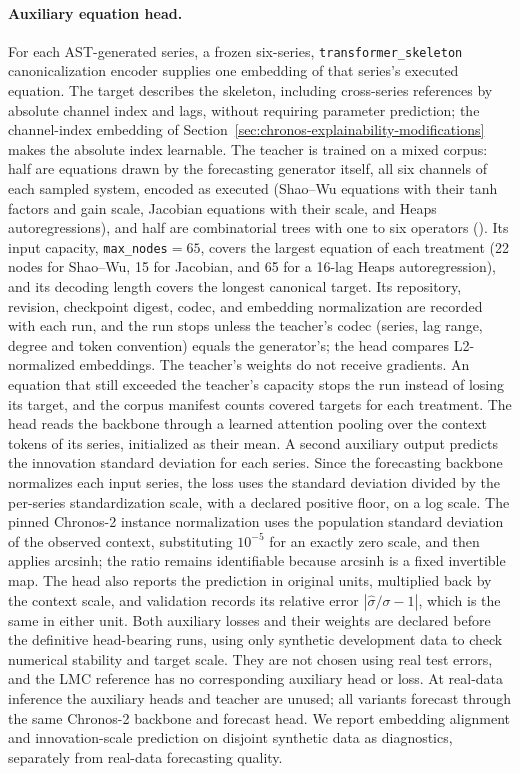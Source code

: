 \paragraph{Auxiliary equation head.}
For each AST-generated series, a frozen six-series,
\texttt{transformer\_skeleton} canonicalization encoder supplies one embedding
of that series's executed equation. The target describes the skeleton,
including cross-series references by absolute channel index and lags, without
requiring parameter prediction; the channel-index embedding of
Section~\ref{sec:chronos-explainability-modifications} makes the absolute index
learnable. The teacher is trained on a mixed corpus: half are equations drawn
by the forecasting generator itself, all six channels of each sampled system,
encoded as executed (Shao--Wu equations with their tanh factors and gain scale,
Jacobian equations with their scale, and Heaps autoregressions), and half are
combinatorial trees with one to six operators
(). Its input
capacity, \texttt{max\_nodes}${}=65$, covers the largest equation of each
treatment (22 nodes for Shao--Wu, 15 for Jacobian, and 65 for a 16-lag Heaps
autoregression), and its decoding length covers the longest canonical target.
Its repository, revision, checkpoint digest, codec, and embedding
normalization are recorded with each run, and the run stops unless the
teacher's codec (series, lag range, degree and token convention) equals the
generator's; the head compares L2-normalized
embeddings. The teacher's weights do not receive gradients. An equation that
still exceeded the teacher's capacity stops the run instead of losing its
target, and the corpus manifest counts covered targets for each treatment. The head reads the backbone through a
learned attention pooling over the context tokens of its series, initialized
as their mean. A second auxiliary output predicts the innovation standard
deviation for each series. Since the forecasting backbone normalizes each
input series, the loss uses the standard deviation divided by the per-series
standardization scale, with a declared positive floor, on a log scale. The
pinned Chronos-2 instance normalization uses the population standard deviation
of the observed context, substituting $10^{-5}$ for an exactly zero scale, and
then applies arcsinh; the ratio remains identifiable because arcsinh is a
fixed invertible map. The head also reports the prediction in original units,
multiplied back by the context scale, and validation records its relative
error $|\hat\sigma/\sigma-1|$, which is the same in either unit. Both auxiliary losses and their weights
are declared before the definitive head-bearing runs, using only synthetic
development data to check numerical stability and target scale. They are not
chosen using real test errors, and the LMC reference has no corresponding
auxiliary head or loss. At
real-data inference the auxiliary heads and teacher are unused; all variants
forecast through the same Chronos-2 backbone and forecast head. We report
embedding alignment and innovation-scale prediction on disjoint synthetic
data as diagnostics, separately from real-data forecasting quality.

